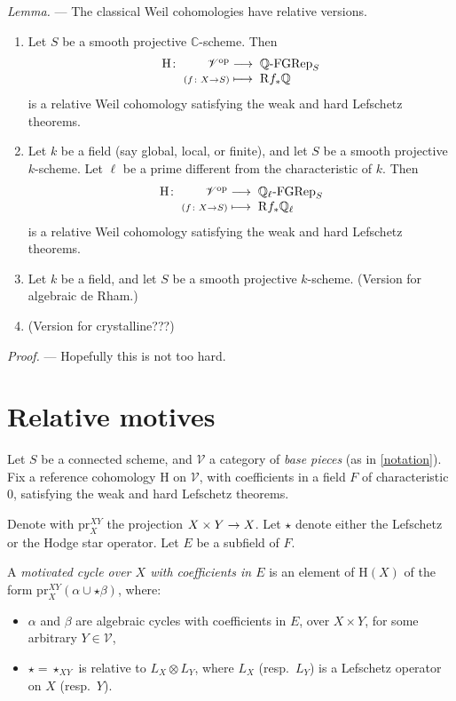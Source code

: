 \documentclass[a4paper,10pt]{article}
\newenvironment{lemma}{\medskip\textit{Lemma.} --- }{}
\newenvironment{proof}{\textit{Proof.} --- }{\medskip}
\def\basepieces{\mathscr{V}}
\newcommand{\fgrep}[2]{#1\textrm{-}\mathrm{FGRep}_{#2}}
\def\coh{\mathrm{H}}
\def\tensor{\otimes}
\def\pr{\mathrm{pr}}
\begin{document}
\begin{lemma} %
	The classical Weil cohomologies have relative versions.
	\begin{enumerate} %
		\item Let $S$ be a smooth projective $\mathbb{C}$-scheme. Then
			\[
				\map[\coh]%
				{\basepieces^{\mathrm{op}}}%
				{\fgrep{\mathbb{Q}}{S}}%
				[\scriptstyle(\map[f]{X}{S})]%
				[\mathrm{R}f_{*}\mathbb{Q}]
			\]
			is a relative Weil cohomology satisfying the weak and
			hard Lefschetz theorems.
		\item Let $k$ be a field (say global, local, or finite), and
			let $S$ be a smooth projective $k$-scheme. Let $\ell$
			be a prime different from the characteristic of $k$.
			Then
			\[
				\map[\coh]%
				{\basepieces^{\mathrm{op}}}%
				{\fgrep{\mathbb{Q_{\ell}}}{S}}%
				[\scriptstyle(\map[f]{X}{S})]%
				[\mathrm{R}f_{*}\mathbb{Q}_{\ell}]
			\]
			is a relative Weil cohomology satisfying the weak and
			hard Lefschetz theorems.
		\item Let $k$ be a field, and let $S$ be a smooth projective
			$k$-scheme. (Version for algebraic de Rham.)
		\item (Version for crystalline???)
	\end{enumerate} %
	\begin{proof} %
		Hopefully this is not too hard.
	\end{proof} %
\end{lemma} %

\section{Relative motives}

Let $S$ be a connected scheme, and $\basepieces$ a category of \emph{base
pieces} (as in \cref{notation}). Fix a reference cohomology $\coh$ on
$\basepieces$, with coefficients in a field $F$ of characteristic $0$,
satisfying the weak and hard Lefschetz theorems.

Denote with $\pr^{XY}_{X}$ the projection $\map{X \times Y}{X}$. Let $\star$
denote either the Lefschetz or the Hodge star operator. Let $E$ be a subfield
of $F$.

A \emph{motivated cycle over $X$ with coefficients in $E$} is an element of
$\coh(X)$ of the form $\pr^{XY}_{X}(\alpha \cup \star \beta)$, where:
\begin{itemize} %
	\item $\alpha$ and $\beta$ are algebraic cycles with coefficients in
		$E$, over $X \times Y$, for some arbitrary $Y \in \basepieces$,
	\item $\star = \star_{XY}$ is relative to $L_{X} \tensor L_{Y}$, where
		$L_{X}$ (resp.\ $L_{Y}$) is a Lefschetz operator on $X$ (resp.\
		$Y$).
\end{itemize} %
\end{document}
